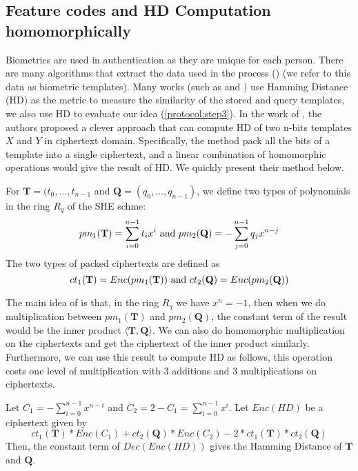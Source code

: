 \subsection{Feature codes and HD Computation homomorphically}
\label{sec:HDComp}
Biometrics are used in authentication as they are unique for each person. There are
many algorithms that extract the data used in the process (\cite{FVConGoi2:online})
(we refer to this data as biometric templates). Many works (such as
\cite{daugman2003importance} and \cite{FujitsuD7:online}) use Hamming Distance (HD)
as the metric to measure the similarity of the stored and query templates, we also
use HD to evaluate our idea (\ref{protocol:step3}). In the work of
\cite{yasuda2014practical}, the authors proposed a clever approach that can compute
HD of two n-bits templates $X$ and $Y$ in ciphertext domain. Specifically, the
method pack all the bits of a template into a single ciphertext, and a linear
combination of homomorphic operations would give the result of HD. We quickly
present their method below.
\begin{definition}
For $\mathbf{T} = (t_0, \dots,
t_{n-1}$ and $\mathbf{Q} = (q_0, \dots, q_{n-1})$, we define two types of polynomials in the ring $R_q$ of the SHE schme:
\[
pm_1(\mathbf{T}) = \sum_{i=0}^{n-1}t_ix^i
\ \textnormal{and} \ pm_2(\mathbf{Q}) =
- \sum_{j=0}^{n-1}q_jx^{n-j}
\]
The two types of packed ciphertexts are defined as
\[
ct_{1}(\mathbf{T}) = Enc(pm_1(\mathbf{T}))
\ \textnormal{and} \
ct_{2}(\mathbf{Q}) = Enc(pm_2(\mathbf{Q}))
\]
\end{definition}
The main idea of \cite{yasuda2014practical} is that, in the ring $R_q$ we have
$x^n = -1$, then when we do multiplication between $pm_1(\mathbf{T})$ and
$pm_2(\mathbf{Q})$, the constant term of the result would be the inner product
$\langle \mathbf{T}, \mathbf{Q}\rangle$. We can also do homomorphic
multiplication on the ciphertexts and get the ciphertext of the inner product
similarly. Furthermore, we can use this result to compute HD as follows, this
operation costs one level of multiplication with 3 additions and 3
multiplications on ciphertexts.

\begin{theorem}
Let $C_1 = - \sum_{i=0}^{n-1}x^{n-i}$ and
$C_2 = 2 - C_1 = \sum_{i=0}^{n-1}x^i$. Let $Enc(HD)$ be a ciphertext given by
\[
ct_1(\mathbf{T})*Enc(C_1) + ct_2(\mathbf{Q})*
Enc(C_2) - 2*ct_1(\mathbf{T})*ct_2(\mathbf{Q})
\]
Then, the constant term of $Dec(Enc(HD))$ gives the Hamming Distance of $\mathbf{T}$ and $\mathbf{Q}$.
\end{theorem}

